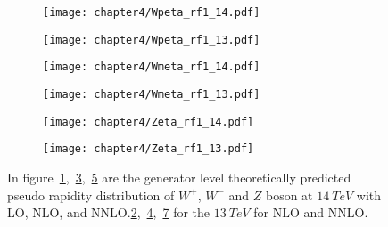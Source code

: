 \documentclass[a4paper,12pt]{report}
\numberwithin{equation}{section}
\begin{document}
\begin{figure}[H]
\centering
\begin{subfigure}{0.49\textwidth}
\texttt{[image: chapter4/Wpeta\_rf1\_14.pdf]}
\vspace*{-8mm}
\caption{}
\label{eta141}
\end{subfigure}
\begin{subfigure}{0.49\textwidth}
\texttt{[image: chapter4/Wpeta\_rf1\_13.pdf]}
\vspace*{-8mm}
\caption{}
\label{eta131}
\end{subfigure}
\begin{subfigure}{0.49\textwidth}
\texttt{[image: chapter4/Wmeta\_rf1\_14.pdf]}
\vspace*{-8mm}
\caption{}
\label{eta142}
\end{subfigure}
\begin{subfigure}{0.49\textwidth}
\texttt{[image: chapter4/Wmeta\_rf1\_13.pdf]}
\vspace*{-8mm}
\caption{}
\label{eta132}
\end{subfigure}
\begin{subfigure}{0.49\textwidth}
\texttt{[image: chapter4/Zeta\_rf1\_14.pdf]}
\vspace*{-8mm}
\caption{}
\label{eta143}
\end{subfigure}
\begin{subfigure}{0.49\textwidth}
\texttt{[image: chapter4/Zeta\_rf1\_13.pdf]}
\vspace*{-8mm}
\caption{}
\label{eta133}
\end{subfigure}
\caption{In figure~\ref{eta141},~\ref{eta142},~\ref{eta143} are the generator level theoretically predicted pseudo rapidity distribution of $W^{+}$, $W^{-}$ and $Z$ boson at $14~TeV$ with LO, NLO, and NNLO.\ref{eta131},~\ref{eta132},~\ref{eta133} for the $13~TeV$ for NLO and NNLO.}  
\end{figure}
\end{document}
